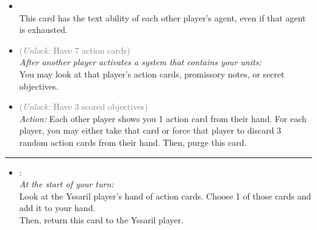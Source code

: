 \begin{multicols}{2}
\begin{itemize}
\item {}\\
This card has the text ability of each other player's agent, even if that agent is exhausted. 
\item {} \textcolor{gray}{(\emph{Unlock:} Have 7 action cards)} \\
\emph{After another player activates a system that contains your units:}\\ You may look at that player's action cards, promissory notes, or secret objectives.
\item {} \textcolor{gray}{(\emph{Unlock:} Have 3 scored objectives)}\\
\emph{Action:} Each other player shows you 1 action card from their hand. For each player, you may either take that card or force that player to discard 3 random action cards from their hand. Then, purge this card. 
\end{itemize}

\vspace{-10pt}\rule{\hsize}{0.4pt}\vspace{5pt}


\begin{itemize}
\item {}:\\
\emph{At the start of your turn:}\\
Look at the Yssaril player's hand of action cards. Choose 1 of those cards and add it to your hand.\\
Then, return this card to the Yssaril player.
\end{itemize}

\end{multicols}



